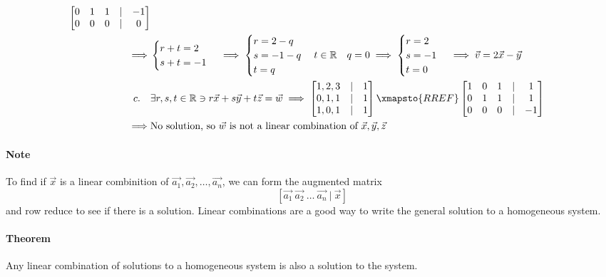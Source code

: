 \begin{align*}
\begin{bmatrix}
        0 & 1 & 1 & | & -1 \\
        0 & 0 & 0 & | & 0
    \end{bmatrix} \\
    \implies & \begin{cases}
        r + t = 2 \\
        s + t = -1
    \end{cases} \implies \begin{cases}
        r = 2 - q \\
        s = -1 - q \\
        t = q
    \end{cases} t \in \mathbb{R} \quad q = 0 \implies \begin{cases}
        r = 2 \\
        s = -1 \\
        t = 0
    \end{cases} \implies \vec{v} = 2\vec{x} - \vec{y} \\
    c. \quad & \exists r, s, t \in \mathbb{R} \ni r\vec{x} + s\vec{y} + t\vec{z} = \vec{w} \implies \begin{bmatrix}
        1, 2, 3 & | & 1 \\
        0, 1, 1 & | & 1 \\
        1, 0, 1 & | & 1
    \end{bmatrix} \xmapsto{RREF} \begin{bmatrix}
        1 & 0 & 1 & | & 1 \\
        0 & 1 & 1 & | & 1 \\
        0 & 0 & 0 & | & -1
    \end{bmatrix} \\
    \implies & \text{No solution, so $\vec{w}$ is not a linear combination of $\vec{x}, \vec{y}, \vec{z}$}
\end{align*} 

\paragraph*{Note} To find if $\vec{x}$ is a linear combinition of $\vec{a_1}, \vec{a_2}, \ldots, \vec{a_n}$, we can form the augmented matrix
\[[\vec{a_1} \ \vec{a_2} \ \ldots \ \vec{a_n} \ | \ \vec{x}]\]
and row reduce to see if there is a solution. Linear combinations are a good way to write the general solution to a homogeneous system.

\paragraph*{Theorem} Any linear combination of solutions to a homogeneous system is also a solution to the system.
